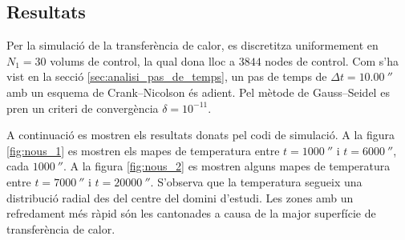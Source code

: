 
\subsection{Resultats}

Per la simulació de la transferència de calor, es discretitza uniformement en $N_1 = 30$ volums de control, la qual dona lloc a $3844$ nodes de control. Com s'ha vist en la secció \ref{sec:analisi_pas_de_temps}, un pas de temps de $\Delta t = 10.00 \ \second$ amb un esquema de Crank--Nicolson és adient. Pel mètode de Gauss--Seidel es pren un criteri de convergència $\delta = 10^{-11}$.  

A continuació es mostren els resultats donats pel codi de simulació. A la figura \ref{fig:nous_1} es mostren els mapes de temperatura entre $t = 1000 \ \second$ i $t = 6000 \ \second$, cada $1000 \ \second$. A la figura \ref{fig:nous_2} es mostren alguns mapes de temperatura entre $t = 7000 \ \second$ i $t = 20000 \ \second$. S'observa que la temperatura segueix una distribució radial des del centre del domini d'estudi. Les zones amb un refredament més ràpid són les cantonades a causa de la major superfície de transferència de calor.


